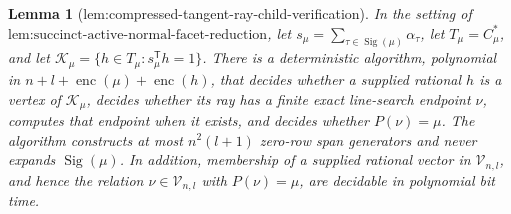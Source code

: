 \documentclass{article}
\newtheorem{lemma}{Lemma}
\begin{document}
\begin{lemma}[lem:compressed-tangent-ray-child-verification]\label{lem:compressed-tangent-ray-child-verification}
In the setting of \(\text{lem:succinct-active-normal-facet-reduction}\), let \(s_\mu=\sum_{\tau\in\operatorname{Sig}(\mu)}\alpha_\tau\), let \(T_\mu=C_\mu^*\), and let \(\mathcal K_\mu=\{h\in T_\mu:s_\mu^{\mathsf T}h=1\}\). There is a deterministic algorithm, polynomial in \(n+l+\operatorname{enc}(\mu)+\operatorname{enc}(h)\), that decides whether a supplied rational \(h\) is a vertex of \(\mathcal K_\mu\), decides whether its ray has a finite exact line-search endpoint \(\nu\), computes that endpoint when it exists, and decides whether \(P(\nu)=\mu\). The algorithm constructs at most \(n^2(l+1)\) zero-row span generators and never expands \(\operatorname{Sig}(\mu)\). In addition, membership of a supplied rational vector in \(\mathcal V_{n,l}\), and hence the relation \(\nu\in\mathcal V_{n,l}\) with \(P(\nu)=\mu\), are decidable in polynomial bit time.
\end{lemma}
\end{document}
